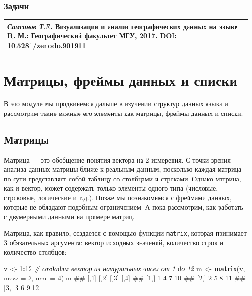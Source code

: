\documentclass[]{book}
\newenvironment{Shaded}{\begin{snugshade}}{\end{snugshade}}
\newcommand{\KeywordTok}[1]{\textcolor[rgb]{0.13,0.29,0.53}{\textbf{#1}}}
\newcommand{\DataTypeTok}[1]{\textcolor[rgb]{0.13,0.29,0.53}{#1}}
\newcommand{\DecValTok}[1]{\textcolor[rgb]{0.00,0.00,0.81}{#1}}
\newcommand{\StringTok}[1]{\textcolor[rgb]{0.31,0.60,0.02}{#1}}
\newcommand{\CommentTok}[1]{\textcolor[rgb]{0.56,0.35,0.01}{\textit{#1}}}
\newcommand{\OperatorTok}[1]{\textcolor[rgb]{0.81,0.36,0.00}{\textbf{#1}}}
\newcommand{\NormalTok}[1]{#1}
\begin{document}
\subsection{Задачи}\label{tasks_vectors}

\begin{longtable}[]{@{}l@{}}
\toprule
\emph{Самсонов Т.Е.} \textbf{Визуализация и анализ географических данных
на языке R.} М.: Географический факультет МГУ, 2017. DOI:
10.5281/zenodo.901911\tabularnewline
\bottomrule
\end{longtable}

\chapter{Матрицы, фреймы данных и списки}\label{matrix_dataframes}

В это модуле мы продвинемся дальше в изучении структур данных языка и
рассмотрим такие важные его элементы как матрицы, фреймы данных и
списки.

\section{Матрицы}\label{matrices}

Матрица --- это обобщение понятия вектора на 2 измерения. С точки зрения
анализа данных матрицы ближе к реальным данным, посколько каждая матрица
по сути представляет собой таблицу со столбцами и строками. Однако
матрица, как и вектор, может содержать только элементы одного типа
(числовые, строковые, логические и т.д.). Позже мы познакомимся с
фреймами данных, которые не обладают подобным ограничением. А пока
рассмотрим, как работать с двумерными данными на примере матриц.

Матрица, как правило, создается с помощью функции \texttt{matrix},
которая принимает 3 обязательных аргумента: вектор исходных значений,
количество строк и количество столбцов:

\begin{Shaded}
\begin{Highlighting}[]
\NormalTok{v <-}\StringTok{ }\DecValTok{1}\OperatorTok{:}\DecValTok{12}  \CommentTok{# создадим вектор из натуральных чисел от 1 до 12}
\NormalTok{m <-}\StringTok{ }\KeywordTok{matrix}\NormalTok{(v, }\DataTypeTok{nrow =} \DecValTok{3}\NormalTok{, }\DataTypeTok{ncol =} \DecValTok{4}\NormalTok{)}
\NormalTok{m}
\NormalTok{##      [,1] [,2] [,3] [,4]}
\NormalTok{## [1,]    1    4    7   10}
\NormalTok{## [2,]    2    5    8   11}
\NormalTok{## [3,]    3    6    9   12}
\end{Highlighting}
\end{Shaded}
\end{document}
